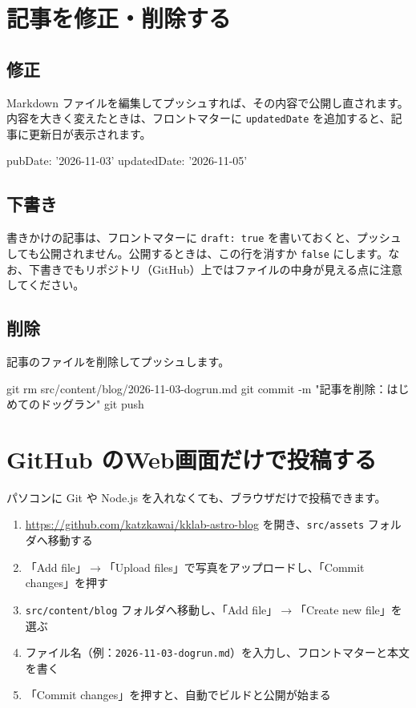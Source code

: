 \documentclass[a4paper,11pt]{ltjsarticle}
\newcommand{\file}[1]{\texttt{#1}}
\begin{document}
\section{記事を修正・削除する}

\subsection{修正}

Markdown ファイルを編集してプッシュすれば、その内容で公開し直されます。内容を大きく変えたときは、フロントマターに \file{updatedDate} を追加すると、記事に更新日が表示されます。

\begin{code}
pubDate: '2026-11-03'
updatedDate: '2026-11-05'
\end{code}

\subsection{下書き}

書きかけの記事は、フロントマターに \file{draft: true} を書いておくと、プッシュしても公開されません。公開するときは、この行を消すか \file{false} にします。なお、下書きでもリポジトリ（GitHub）上ではファイルの中身が見える点に注意してください。

\subsection{削除}

記事のファイルを削除してプッシュします。

\begin{code}
git rm src/content/blog/2026-11-03-dogrun.md
git commit -m "記事を削除：はじめてのドッグラン"
git push
\end{code}

\section{GitHub のWeb画面だけで投稿する}\label{sec:web}

パソコンに Git や Node.js を入れなくても、ブラウザだけで投稿できます。

\begin{enumerate}
  \item \url{https://github.com/katzkawai/kklab-astro-blog} を開き、\file{src/assets} フォルダへ移動する
  \item 「Add file」$\to$「Upload files」で写真をアップロードし、「Commit changes」を押す
  \item \file{src/content/blog} フォルダへ移動し、「Add file」$\to$「Create new file」を選ぶ
  \item ファイル名（例：\file{2026-11-03-dogrun.md}）を入力し、フロントマターと本文を書く
  \item 「Commit changes」を押すと、自動でビルドと公開が始まる
\end{enumerate}
\end{document}
